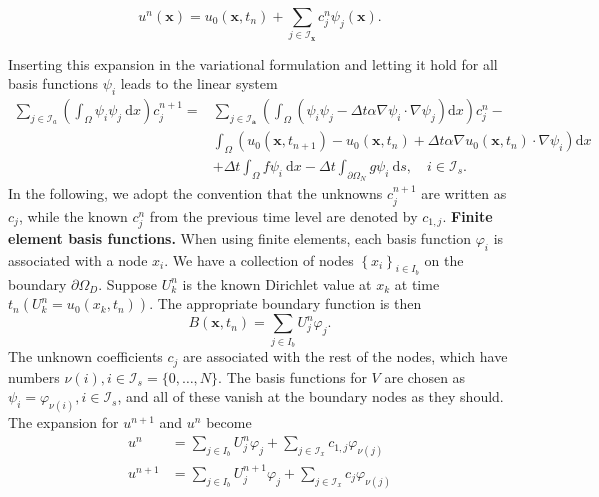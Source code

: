 \documentclass[../main.tex]{subfiles}
\begin{document}
		\begin{equation}
		\label{eqa239}
			u^{n}(\boldsymbol{x})=u_{0}\left(\boldsymbol{x}, t_{n}\right)+\sum_{j \in 	\mathcal{I}_{\boldsymbol{x}}} c_{j}^{n} \psi_{j}(\boldsymbol{x}) .
		\end{equation}
	
		\noindent Inserting this expansion in the variational formulation and letting it hold for all basis functions $\psi_{i}$ leads to the linear system
		$$
		\begin{aligned}
			\sum_{j \in \mathcal{I}_{a}}\left(\int_{\Omega} \psi_{i} \psi_{j} \mathrm{~d} x\right) c_{j}^{n+1}=& \sum_{j \in \mathcal{I}_{\boldsymbol{a}}}\left(\int_{\Omega}\left(\psi_{i} \psi_{j}-\Delta t \alpha \nabla \psi_{i} \cdot \nabla \psi_{j}\right) \mathrm{d} x\right) c_{j}^{n}-\\
			& \int_{\Omega}\left(u_{0}\left(\boldsymbol{x}, t_{n+1}\right)-u_{0}\left(\boldsymbol{x}, t_{n}\right)+\Delta t \alpha \nabla u_{0}\left(\boldsymbol{x}, t_{n}\right) \cdot \nabla \psi_{i}\right) \mathrm{d} x \\
			&+\Delta t \int_{\Omega} f \psi_{i} \mathrm{~d} x-\Delta t \int_{\partial \Omega_{N}} g \psi_{i} \mathrm{~d} s, \quad i \in \mathcal{I}_{s} .
		\end{aligned}
		$$
		In the following, we adopt the convention that the unknowns $c_{j}^{n+1}$ are written as $c_{j}$, while the known $c_{j}^{n}$ from the previous time level are denoted by $c_{1, j}$.\bigbreak
		\noindent \textbf{Finite element basis functions.   } When using finite elements, each basis function $\varphi_{i}$ is associated with a node $x_{i}$. We have a collection of nodes $\left\{x_{i}\right\}_{i \in I_{b}}$ on the boundary $\partial \Omega_{D}$. Suppose $U_{k}^{n}$ is the known Dirichlet value at $x_{k}$ at time $t_{n}\left(U_{k}^{n}=u_{0}\left(x_{k}, t_{n}\right)\right)$. The appropriate boundary function is then
		$$
		B\left(\boldsymbol{x}, t_{n}\right)=\sum_{j \in I_{b}} U_{j}^{n} \varphi_{j} .
		$$
		The unknown coefficients $c_{j}$ are associated with the rest of the nodes, which have numbers $\nu(i), i \in \mathcal{I}_{s}=\{0, \ldots, N\}$. The basis functions for $V$ are chosen as $\psi_{i}=\varphi_{\nu(i)}, i \in \mathcal{I}_{s}$, and all of these vanish at the boundary nodes as they should. The expansion for $u^{n+1}$ and $u^{n}$ become
		$$
		\begin{aligned}
			u^{n} &=\sum_{j \in I_{b}} U_{j}^{n} \varphi_{j}+\sum_{j \in \mathcal{I}_{x}} c_{1, j} \varphi_{\nu(j)} \\
			u^{n+1} &=\sum_{j \in I_{b}} U_{j}^{n+1} \varphi_{j}+\sum_{j \in \mathcal{I}_{x}} c_{j} \varphi_{\nu(j)}
		\end{aligned}
		$$
		
\end{document}
